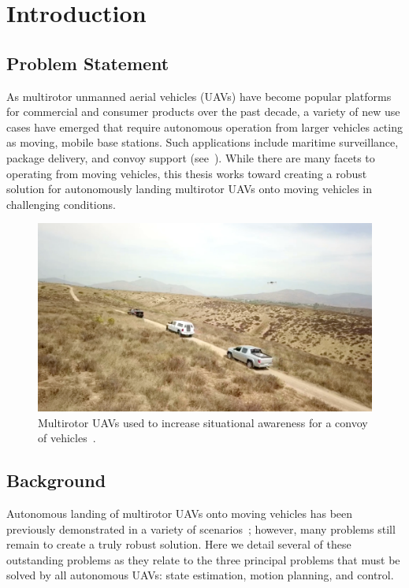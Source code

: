 
\chapter{Introduction}
\label{chp:introduction}

\section{Problem Statement}
As multirotor unmanned aerial vehicles (UAVs) have become popular
platforms for commercial and consumer products over the past decade, a variety
of new use cases have emerged that require autonomous operation from larger
vehicles acting as moving, mobile base stations.
Such applications include
maritime surveillance, package delivery, and convoy
support (see~).
While there are
many facets to operating from moving vehicles, this thesis works toward creating
a robust solution for autonomously landing multirotor UAVs onto moving vehicles
in challenging conditions.

\begin{figure}[htbp]
  \centering
  \includegraphics[width=4.5in]{figures/drone_convoy_support.png}
  \caption[UAV Convoy Support]{Multirotor UAVs used to increase
  situational awareness for a convoy of
vehicles~\cite{ground_vehicle_drone}.}
%
  \label{fig:drone_convoy_support}
\end{figure}


\section{Background}

Autonomous landing of multirotor UAVs onto moving vehicles has been previously
demonstrated in a variety of scenarios~\cite{wynn2019visual}; however, many problems still remain to
create a truly robust solution. Here we detail several of these outstanding
problems as they relate to the three principal problems that must be solved by
all autonomous UAVs: state estimation, motion planning, and control.

